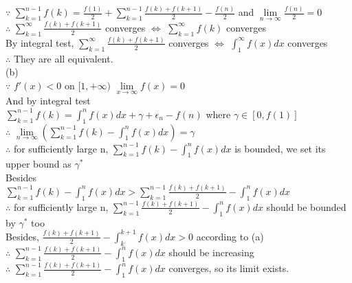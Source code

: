 \documentclass{article}
\begin{document}
$\because$ \qquad $\displaystyle \sum \limits_{k=1}^{n-1} f(k) = \frac{f(1)}{2} + \sum \limits_{k=1}^{n-1} \frac{f(k) + f(k+1)}{2} - \frac{f(n)}{2}$ and $\lim \limits_{n \to \infty} \frac{f(n)}{2} = 0$\\

$\therefore$ \qquad $\displaystyle \sum \limits_{k=1}^\infty \frac{f(k) + f(k+1)}{2}$ converges $\Leftrightarrow$ $\displaystyle \sum \limits_{k=1}^\infty f(k)$ converges\\

By integral test, $\displaystyle \sum \limits_{k=1}^\infty \frac{f(k) + f(k+1)}{2}$ converges $\Leftrightarrow$ $\displaystyle \int_1^\infty f(x)dx$ converges\\

$\therefore$ \qquad They are all equivalent.\\

(b)\\

$\because$ \qquad $f'(x) < 0$ on $[1, +\infty)$ \qquad $\lim \limits_{x \to \infty} f(x) = 0$\\

And by integral test\\

$\displaystyle \sum \limits_{k=1}^{n-1} f(k) = \int_1^n f(x)dx + \gamma + \epsilon_n -f(n)$ where $\gamma \in [0,f(1)]$\\

$\therefore$ \qquad $\displaystyle \lim \limits_{n \to \infty} \left( \sum \limits_{k=1}^{n-1}f(k) - \int_1^nf(x)dx\right) = \gamma$\\

$\therefore$ \qquad for sufficiently large n, $\displaystyle \sum \limits_{k=1}^{n-1}f(k) - \int_1^nf(x)dx$ is bounded, we set its upper bound as $\gamma^*$\\

Besides\\

$\displaystyle \sum \limits_{k=1}^{n-1}f(k) - \int_1^nf(x)dx > \sum \limits_{k=1}^{n-1} \frac{f(k) + f(k+1)}{2} - \int_1^nf(x)dx$\\

$\therefore$ \qquad for sufficiently large n, $\sum \limits_{k=1}^{n-1} \frac{f(k) + f(k+1)}{2} - \int_1^nf(x)dx$ should be bounded by $\gamma^*$ too\\

Besides, $\frac{f(k) + f(k+1)}{2} - \int_k^{k+1}f(x)dx > 0$ according to (a)\\

$\therefore$ \qquad $\sum \limits_{k=1}^{n-1} \frac{f(k) + f(k+1)}{2} - \int_1^nf(x)dx$ should be increasing\\

$\therefore$ \qquad $\sum \limits_{k=1}^{n-1} \frac{f(k) + f(k+1)}{2} - \int_1^nf(x)dx$ converges, so its limit exists.\\

\vskip 3cm
\end{document}
